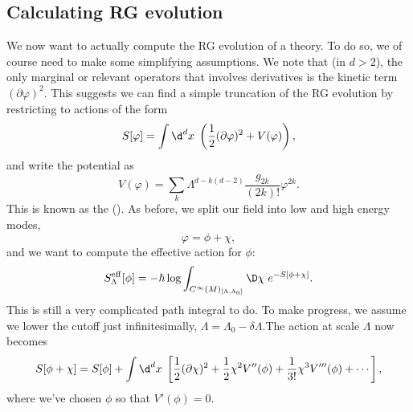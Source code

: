 \documentclass[a4paper]{article}
\begin{document}
%
%
%

\subsection{Calculating RG evolution}
We now want to actually compute the RG evolution of a theory. To do so, we of course need to make some simplifying assumptions. We note that (in $d > 2$), the only marginal or relevant operators that involves derivatives is the kinetic term $(\partial \varphi)^2$. This suggests we can find a simple truncation of the RG evolution by restricting to actions of the form
\[
  S[\varphi] = \int \d^d x\; \left(\frac{1}{2} (\partial \varphi)^2 + V(\varphi)\right),
\]
and write the potential as
\[
  V(\varphi) = \sum_k\Lambda^{d - k(d - 2)} \frac{g_{2k}}{(2k)!} \varphi^{2k}.
\]
This is known as the  (). As before, we split our field into low and high energy modes,
\[
  \varphi = \phi + \chi,
\]
and we want to compute the effective action for $\phi$:
\[
  S_{\Lambda}^{\mathrm{eff}} [\phi] = - \hbar \log \int_{C^\infty(M)_{[\Lambda, \Lambda_0]}} \D \chi\; e^{-S[\phi + \chi]}.
\]
This is still a very complicated path integral to do. To make progress, we assume we lower the cutoff just infinitesimally, $\Lambda = \Lambda_0 - \delta \Lambda$.The action at scale $\Lambda$ now becomes
\[
  S[\phi + \chi] = S[\phi] + \int \d^d x\; \left[\frac{1}{2} (\partial \chi)^2 + \frac{1}{2} \chi^2 V''(\phi) + \frac{1}{3!} \chi^3 V'''(\phi) + \cdots\right],
\]
where we've chosen $\phi$ so that $V'(\phi) = 0$. %
\end{document}
